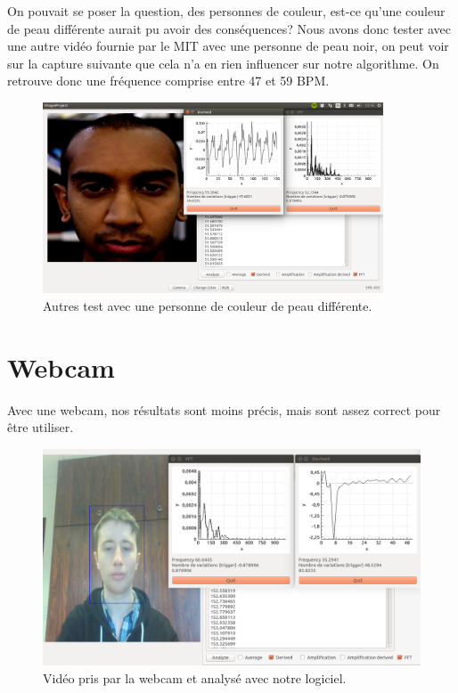 On pouvait se poser la question, des personnes de couleur, est-ce qu'une couleur de peau différente aurait pu avoir des conséquences? Nous avons
donc tester avec une autre vidéo fournie par le MIT avec une personne de peau noir, on peut voir sur la capture suivante que cela n'a en rien influencer
sur notre algorithme. On retrouve donc une fréquence comprise entre 47 et 59 BPM\@.

\begin{figure}[h!]
	\centering
	\includegraphics[width=0.9\textwidth]{data/logi.png}
	\caption{Autres test avec une personne de couleur de peau différente.}
\end{figure}


\section{Webcam}

Avec une webcam, nos résultats sont moins précis, mais sont assez correct pour être utiliser.

\begin{figure}[h!]
	\centering
	\includegraphics[width=1\textwidth]{data/webcam.png}
	\caption{Vidéo pris par la webcam et analysé avec notre logiciel.}
\end{figure}


